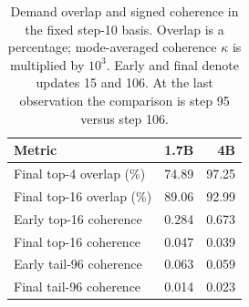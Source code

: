 \begin{table}[t]
\centering
\caption{Demand overlap and signed coherence in the fixed step-10 basis. Overlap is a percentage; mode-averaged coherence $\kappa$ is multiplied by $10^3$. Early and final denote updates 15 and 106. At the last observation the comparison is step 95 versus step 106.}
\label{tab:demand}
\small
\setlength{\tabcolsep}{3pt}
\begin{tabular}{lrr}
\toprule
Metric & 1.7B & 4B \\
\midrule
Final top-4 overlap (\%) & 74.89 & 97.25 \\
Final top-16 overlap (\%) & 89.06 & 92.99 \\
Early top-16 coherence & 0.284 & 0.673 \\
Final top-16 coherence & 0.047 & 0.039 \\
Early tail-96 coherence & 0.063 & 0.059 \\
Final tail-96 coherence & 0.014 & 0.023 \\
\bottomrule
\end{tabular}
\end{table}
